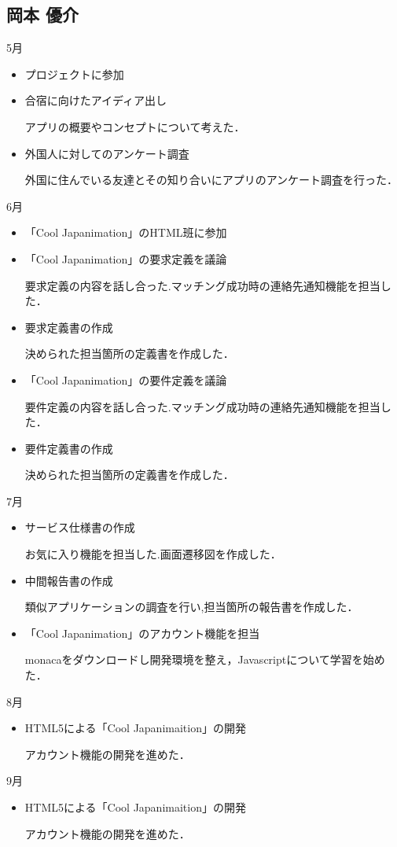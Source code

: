 \subsection{岡本 優介}
5月
\begin{itemize}
\item プロジェクトに参加
\item 合宿に向けたアイディア出し
\par アプリの概要やコンセプトについて考えた．
\item 外国人に対してのアンケート調査
\par 外国に住んでいる友達とその知り合いにアプリのアンケート調査を行った．
\end{itemize}
6月
\begin{itemize}
\item 「Cool Japanimation」のHTML班に参加
\item 「Cool Japanimation」の要求定義を議論
\par 要求定義の内容を話し合った.マッチング成功時の連絡先通知機能を担当した．
\item 要求定義書の作成
\par 決められた担当箇所の定義書を作成した．
\item 「Cool Japanimation」の要件定義を議論
\par 要件定義の内容を話し合った.マッチング成功時の連絡先通知機能を担当した．
\item 要件定義書の作成
\par 決められた担当箇所の定義書を作成した．
\end{itemize}
7月
\begin{itemize}
\item サービス仕様書の作成
\par お気に入り機能を担当した.画面遷移図を作成した．
\item 中間報告書の作成
\par 類似アプリケーションの調査を行い,担当箇所の報告書を作成した．
\item 「Cool Japanimation」のアカウント機能を担当
\par monacaをダウンロードし開発環境を整え，Javascriptについて学習を始めた．
\end{itemize}
8月
\begin{itemize}
\item HTML5による「Cool Japanimaition」の開発
\par アカウント機能の開発を進めた．
\end{itemize}
9月
\begin{itemize}
\item HTML5による「Cool Japanimaition」の開発
\par アカウント機能の開発を進めた．
\end{itemize}
